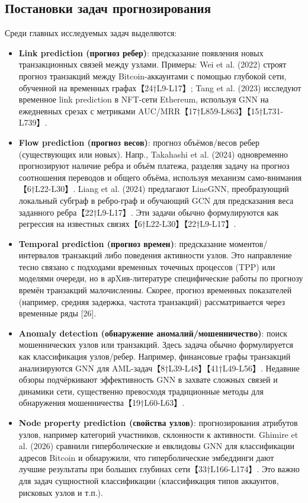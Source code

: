 \subsection{Постановки задач прогнозирования}
Среди главных исследуемых задач выделяются:
\begin{itemize}
\item \textbf{Link prediction (прогноз ребер)}: предсказание появления новых транзакционных связей между узлами. Примеры: Wei et al. (2022) строят прогноз транзакций между Bitcoin-аккаунтами с помощью глубокой сети, обученной на временных графах【24†L9-L17】; Tang et al. (2023) исследуют временное link prediction в NFT-сети Ethereum, используя GNN на ежедневных срезах с метриками AUC/MRR【17†L859-L863】【15†L731-L739】.
\item \textbf{Flow prediction (прогноз весов)}: прогноз объёмов/весов ребер (существующих или новых). Напр., Takahashi et al. (2024) одновременно прогнозируют наличие ребра и объём платежа, разделяя задачу на прогноз соотношения переводов и общего объёма, используя механизм само-внимания【6†L22-L30】. Liang et al. (2024) предлагают LineGNN, преобразующий локальный субграф в ребро-граф и обучающий GCN для предсказания веса заданного ребра【22†L9-L17】. Эти задачи обычно формулируются как регрессия на известных связях【6†L22-L30】【22†L9-L17】.
\item \textbf{Temporal prediction (прогноз времен)}: предсказание моментов/интервалов транзакций либо поведения активности узлов. Это направление тесно связано с подходами временных точечных процессов (TPP) или моделями очереди, но в арXив-литературе специфические работы по прогнозу времён транзакций малочисленны. Скорее, прогноз временных показателей (например, средняя задержка, частота транзакций) рассматривается через временные ряды [26].
\item \textbf{Anomaly detection (обнаружение аномалий/мошенничество)}: поиск мошеннических узлов или транзакций. Здесь задача обычно формулируется как классификация узлов/ребер. Например, финансовые графы транзакций анализируются GNN для AML-задач【8†L39-L48】【41†L49-L56】. Недавние обзоры подчёркивают эффективность GNN в захвате сложных связей и динамики сети, существенно превосходя традиционные методы для обнаружения мошенничества【19†L60-L63】.
\item \textbf{Node property prediction (свойства узлов)}: прогнозирования атрибутов узлов, например категорий участников, склонности к активности. Ghimire et al. (2026) сравнили гиперболические и евклидовы GNN для классификации адресов Bitcoin и обнаружили, что гиперболические эмбеддинги дают лучшие результаты при больших глубинах сети【33†L166-L174】. Это важно для задач сущностной классификации (классификация типов аккаунтов, рисковых узлов и т.п.).
\end{itemize}

